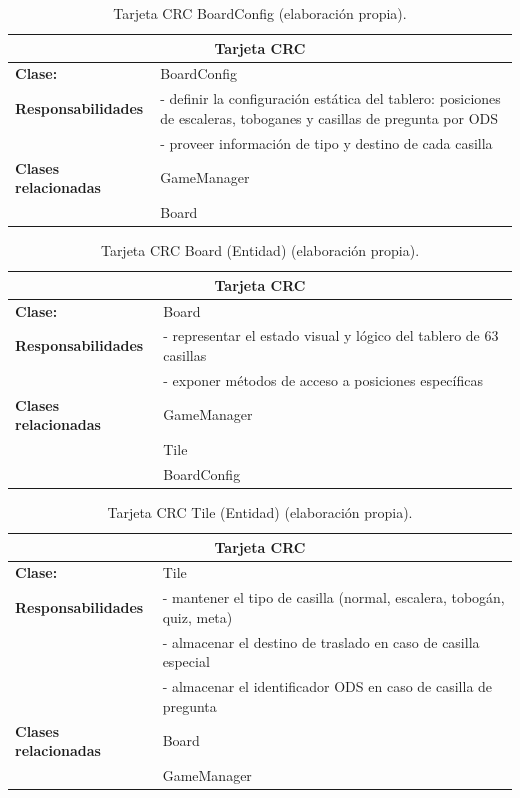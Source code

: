 \begin{table}[H]
\centering
\caption{Tarjeta CRC BoardConfig (elaboración propia).\label{tab:crc_boardconfig}}
\begin{tabular}{|p{}|p{}|}
\hline
\multicolumn{2}{|c|}{\textbf{Tarjeta CRC}} \\
\hline
\textbf{Clase:} & BoardConfig \\
\hline
\textbf{Responsabilidades} & - definir la configuración estática del tablero: posiciones de escaleras, toboganes y casillas de pregunta por ODS \\
& - proveer información de tipo y destino de cada casilla \\
\hline
\textbf{Clases relacionadas} & GameManager \\
& Board \\
\hline
\end{tabular}
\end{table}

\begin{table}[H]
\centering
\caption{Tarjeta CRC Board (Entidad) (elaboración propia).\label{tab:crc_board}}
\begin{tabular}{|p{}|p{}|}
\hline
\multicolumn{2}{|c|}{\textbf{Tarjeta CRC}} \\
\hline
\textbf{Clase:} & Board \\
\hline
\textbf{Responsabilidades} & - representar el estado visual y lógico del tablero de 63 casillas \\
& - exponer métodos de acceso a posiciones específicas \\
\hline
\textbf{Clases relacionadas} & GameManager \\
& Tile \\
& BoardConfig \\
\hline
\end{tabular}
\end{table}

\begin{table}[H]
\centering
\caption{Tarjeta CRC Tile (Entidad) (elaboración propia).\label{tab:crc_tile}}
\begin{tabular}{|p{}|p{}|}
\hline
\multicolumn{2}{|c|}{\textbf{Tarjeta CRC}} \\
\hline
\textbf{Clase:} & Tile \\
\hline
\textbf{Responsabilidades} & - mantener el tipo de casilla (normal, escalera, tobogán, quiz, meta) \\
& - almacenar el destino de traslado en caso de casilla especial \\
& - almacenar el identificador ODS en caso de casilla de pregunta \\
\hline
\textbf{Clases relacionadas} & Board \\
& GameManager \\
\hline
\end{tabular}
\end{table}


